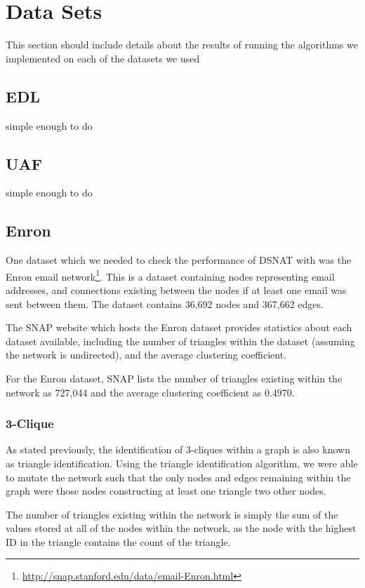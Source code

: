 \section{Data Sets}
This section should include details about the results of running the algorithms we implemented on each of the datasets we used

\subsection{EDL}
simple enough to do

\subsection{UAF}
simple enough to do

\subsection{Enron}
One dataset which we needed to check the performance of DSNAT with was the Enron email network\footnote{\url{http://snap.stanford.edu/data/email-Enron.html}}. This is a dataset containing nodes representing email addresses, and connections existing between the nodes if at least one email was sent between them. The dataset contains 36,692 nodes and 367,662 edges.

The SNAP website which hosts the Enron dataset provides statistics about each dataset available, including the number of triangles within the dataset (assuming the network is undirected), and the average clustering coefficient.

For the Enron dataset, SNAP lists the number of triangles existing within the network as 727,044 and the average clustering coefficient as 0.4970.

\subsubsection{3-Clique}
As stated previously, the identification of 3-cliques within a graph is also known as triangle identification. Using the triangle identification algorithm, we were able to mutate the network such that the only nodes and edges remaining within the graph were those nodes constructing at least one triangle two other nodes.

The number of triangles existing within the network is simply the sum of the values stored at all of the nodes within the network, as the node with the highest ID in the triangle contains the count of the triangle.

